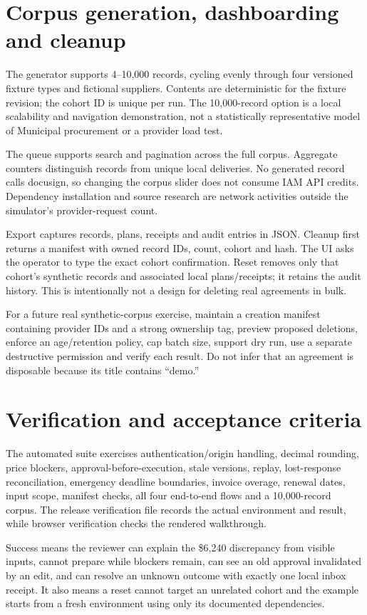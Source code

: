 \documentclass[11pt,letterpaper]{article}
\begin{document}
\section{Corpus generation, dashboarding and cleanup}
The generator supports 4--10,000 records, cycling evenly through four versioned fixture types and fictional suppliers. Contents are deterministic for the fixture revision; the cohort ID is unique per run. The 10,000-record option is a local scalability and navigation demonstration, not a statistically representative model of Municipal procurement or a provider load test.

The queue supports search and pagination across the full corpus. Aggregate counters distinguish records from unique local deliveries. No generated record calls docusign, so changing the corpus slider does not consume IAM API credits. Dependency installation and source research are network activities outside the simulator's provider-request count.

Export captures records, plans, receipts and audit entries in JSON. Cleanup first returns a manifest with owned record IDs, count, cohort and hash. The UI asks the operator to type the exact cohort confirmation. Reset removes only that cohort's synthetic records and associated local plans/receipts; it retains the audit history. This is intentionally not a design for deleting real agreements in bulk.

For a future real synthetic-corpus exercise, maintain a creation manifest containing provider IDs and a strong ownership tag, preview proposed deletions, enforce an age/retention policy, cap batch size, support dry run, use a separate destructive permission and verify each result. Do not infer that an agreement is disposable because its title contains ``demo.''

\section{Verification and acceptance criteria}
The automated suite exercises authentication/origin handling, decimal rounding, price blockers, approval-before-execution, stale versions, replay, lost-response reconciliation, emergency deadline boundaries, invoice overage, renewal dates, input scope, manifest checks, all four end-to-end flows and a 10,000-record corpus. The release verification file records the actual environment and result, while browser verification checks the rendered walkthrough.

Success means the reviewer can explain the \$6,240 discrepancy from visible inputs, cannot prepare while blockers remain, can see an old approval invalidated by an edit, and can resolve an unknown outcome with exactly one local inbox receipt. It also means a reset cannot target an unrelated cohort and the example starts from a fresh environment using only its documented dependencies.
\end{document}
